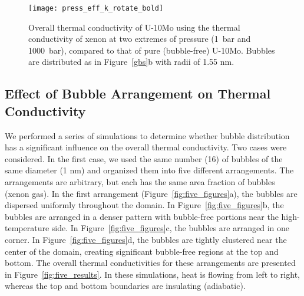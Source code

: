 
\begin{figure}
	\centering
	\texttt{[image: press\_eff\_k\_rotate\_bold]}
	\caption[Overall thermal conductivity of U-10Mo using the thermal 
        conductivity of xenon at two extremes of pressure
        (1~bar and 1000~bar), compared to that of pure (bubble-free) U-10Mo.]{Overall thermal conductivity of U-10Mo using the thermal 
        conductivity of xenon at two extremes of pressure
        (1~bar and 1000~bar), compared to that of pure (bubble-free) U-10Mo. Bubbles are distributed as in Figure~\ref{gbs}b with radii of 1.55 nm.}
	\label{fig_press_K}
\end{figure}

\subsection{Effect of Bubble Arrangement on Thermal Conductivity}
\label{subsec:area}
We performed a series of simulations to determine whether bubble distribution has a significant influence on the overall thermal conductivity. Two cases were considered. In the first case, we used the same number (16) of bubbles of the same diameter (1 nm) and organized them into five different arrangements. The arrangements are arbitrary, but each has the same area fraction of bubbles (xenon gas). In the first arrangement (Figure~\ref{fig:five_figures}a), the bubbles are dispersed uniformly throughout the domain. In Figure~\ref{fig:five_figures}b, the bubbles are arranged in a denser pattern with bubble-free portions near the high-temperature side. In Figure~\ref{fig:five_figures}c, the bubbles are arranged in one corner. In Figure~\ref{fig:five_figures}d, the bubbles are tightly clustered near the center of the domain, creating significant bubble-free regions at the top and bottom. The overall thermal conductivities for these arrangements are presented in Figure~\ref{fig:five_results}.
In these simulations, heat is flowing from left to right, whereas the top and bottom boundaries are insulating (adiabatic).

